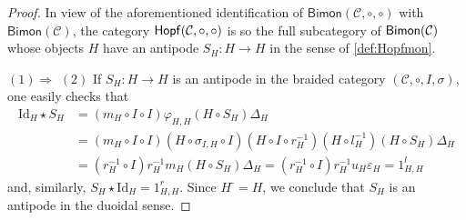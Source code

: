 \documentclass[nosumlimits,twoside]{amsart}
\theoremstyle{definition}
\theoremstyle{remark}
\def\revsn{\text{-}}
\newcommand{\Cc}{\mathcal{C}}
\def\Bimon{{\sf Bimon}}
\def\Hopfmon{{\sf Hopf}}
\begin{document}
\begin{proof}
    In view of the aforementioned identification of $\mathsf{Bimon}(\Cc,\circ,\circ)$ with $\mathsf{Bimon}(\Cc)$, the category $\Hopfmon(\Cc,\circ,\circ)$ is so the full subcategory of $\Bimon(\Cc)$ whose objects $H$ have an antipode $S_H:H\to H$ in the sense of \cref{def:Hopfmon}.

    $(1)\Rightarrow$ $(2)$ If $S_{H}:H\rightarrow H$ is an antipode in the braided category $(\Cc,\circ,I,\sigma)$, one easily checks that
\[
\begin{split}
    \mathrm{Id}%
_{H}\star S_{H}&=(m_{H}\circ I\circ I)\varphi_{H,H}(H\circ S_{H})\Delta_{H}\\&=(m_{H}\circ I\circ I)(H\circ\sigma_{I,H}\circ I)(H\circ I\circ r_{H}^{-1})(H\circ l_{H}^{-1})(H\circ S_{H})\Delta_{H}\\&=
\left( r_{H}^{-1}\circ I\right) r_{H}^{-1}m_{H}\left( H\circ
S_{H}\right) \Delta _{H}=\left( r_{H}^{-1}\circ I\right)
r_{H}^{-1}u_{H}\varepsilon _{H}=1_{H,H}^{l}
\end{split}
\]
and, similarly, $S_{H}\star
\mathrm{Id}_{H}=1_{H,H}^{r}$. Since $H^\revsn=H$, we conclude that $S_H$ is an antipode in the duoidal sense.


\end{proof}
\end{document}
